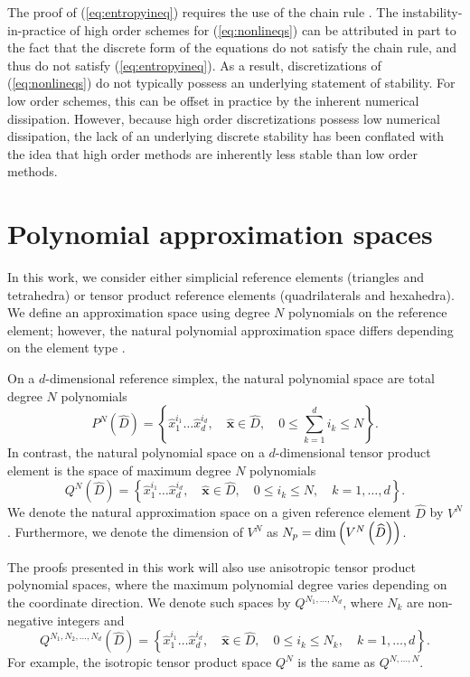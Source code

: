 \documentclass[review]{siamart0216}
\theoremstyle{assumption}
\renewcommand{\hat}[1]{\hat{#1}}
\newcommand{\LRp}[1]{\left( #1 \right)}
\newcommand{\LRc}[1]{\left\{ #1 \right\}}
\renewcommand{\hat}{\widehat}
\begin{document}
The proof of (\ref{eq:entropyineq}) requires the use of the chain rule \cite{mock1980systems, harten1983symmetric, dafermos2005compensated}.  The instability-in-practice of high order schemes for (\ref{eq:nonlineqs}) can be attributed in part to the fact that the discrete form of the equations do not satisfy the chain rule, and thus do not satisfy (\ref{eq:entropyineq}).  As a result, discretizations of (\ref{eq:nonlineqs}) do not typically possess an underlying statement of stability.  For low order schemes, this can be offset in practice by the inherent numerical dissipation.  However, because high order discretizations possess low numerical dissipation, the lack of an underlying discrete stability has been conflated with the idea that high order methods are inherently less stable than low order methods.

\section{Polynomial approximation spaces}
\label{sec:approx}

In this work, we consider either simplicial reference elements (triangles and tetrahedra) or tensor product reference elements (quadrilaterals and hexahedra).  We define an approximation space using degree $N$ polynomials on the reference element; however, the natural polynomial approximation space differs depending on the element type \cite{chan2015gpu}.

On a $d$-dimensional reference simplex, the natural polynomial space are total degree $N$ polynomials 
\[
P^N\LRp{\hat{D}} = \LRc{\hat{x}_1^{i_1}\ldots\hat{x}_d^{i_d}, \quad \hat{\bm{x}} \in \hat{D}, \quad 0\leq \sum_{k=1}^d i_k \leq N}.
\]
In contrast, the natural polynomial space on a $d$-dimensional tensor product element is the space of maximum degree $N$ polynomials
\[
Q^N\LRp{\hat{D}} = \LRc{\hat{x}_1^{i_1}\ldots\hat{x}_d^{i_d}, \quad \hat{\bm{x}} \in \hat{D}, \quad 0\leq i_k \leq N, \quad k = 1,\ldots, d}.
\]
We denote the natural approximation space on a given reference element $\hat{D}$ by $V^N$.  Furthermore, we denote the dimension of $V^N$ as $N_p = {\rm dim}\LRp{V^N\LRp{\hat{D}}}$.  

The proofs presented in this work will also use anisotropic tensor product polynomial spaces, where the maximum polynomial degree varies depending on the coordinate direction.  We denote such spaces by $Q^{N_1, \ldots, N_d}$, where $N_k$ are non-negative integers and
\[
Q^{N_1, N_2, \ldots, N_d}\LRp{\hat{D}} = \LRc{\hat{x}_1^{i_1}\ldots\hat{x}_d^{i_d}, \quad \hat{\bm{x}} \in \hat{D}, \quad 0\leq i_k \leq N_k, \quad k = 1,\ldots, d}.
\]
For example, the isotropic tensor product space $Q^N$ is the same as $Q^{N,\ldots,N}$.
\end{document}
